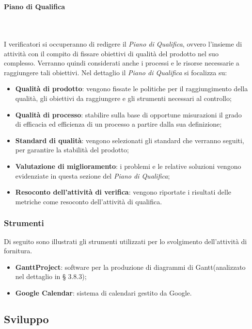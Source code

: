 			\paragraph{Piano di Qualifica} \mbox{} \\ \mbox{} \\
			I verificatori si occuperanno di redigere il \textit{Piano di Qualifica}, ovvero l'insieme di attività con il compito di fissare obiettivi di qualità del prodotto nel suo complesso. Verranno quindi considerati anche i processi e le risorse necessarie a raggiungere tali obiettivi. Nel dettaglio il \textit{Piano di Qualifica} si focalizza su:
			\begin{itemize}
				\item \textbf{Qualità di prodotto}: vengono fissate le politiche per il raggiungimento della qualità, gli obiettivi da raggiungere e gli strumenti necessari al controllo;
				\item \textbf{Qualità di processo}: stabilire sulla base di opportune misurazioni il grado di efficacia ed efficienza di un processo a partire dalla sua definizione;
				\item \textbf{Standard di qualità}: vengono selezionati gli standard che verranno seguiti, per garantire la stabilità del prodotto;
				\item \textbf{Valutazione di miglioramento}: i problemi e le relative soluzioni vengono evidenziate in questa sezione del \textit{Piano di Qualifica};
				\item \textbf{Resoconto dell'attività di verifica}: vengono riportate i risultati delle metriche come resoconto dell'attività di qualifica.
			\end{itemize}
		\subsubsection{Strumenti}
		Di seguito sono illustrati gli strumenti utilizzati per lo svolgimento dell'attività di fornitura.
		\begin{itemize}
			\item \textbf{GanttProject}: software per la produzione di diagrammi di Gantt\glo (analizzato nel dettaglio in § 3.8.3);
			\item \textbf{Google Calendar}: sistema di calendari gestito da Google.
		\end{itemize}

	\subsection{Sviluppo}
